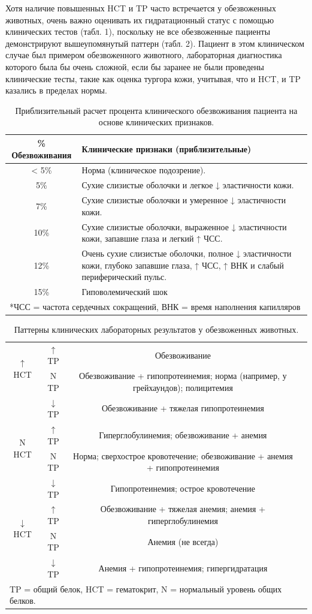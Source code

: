 \documentclass[a4paper,12pt]{book}
\begin{document}
Хотя наличие повышенных HCT и TP часто встречается у обезвоженных животных, очень важно оценивать их гидратационный статус с помощью клинических тестов (табл. 1), поскольку не все обезвоженные пациенты демонстрируют вышеупомянутый паттерн (табл. 2). Пациент в этом клиническом случае был примером обезвоженного животного, лабораторная диагностика которого была бы очень сложной, если бы заранее не были проведены клинические тесты, такие как оценка тургора кожи, учитывая, что и HCT, и TP казались в пределах нормы.

\begin{table}[htbp]
\centering
\caption{Приблизительный расчет процента клинического обезвоживания пациента на основе клинических признаков.}
\begin{tabular}{cl}
\toprule
\% Обезвоживания & Клинические признаки (приблизительные) \\
\midrule
< 5\% & Норма (клиническое подозрение). \\
5\% & Сухие слизистые оболочки и легкое ↓ эластичности кожи. \\
7\% & Сухие слизистые оболочки и умеренное ↓ эластичности кожи. \\
10\% & Сухие слизистые оболочки, выраженное ↓ эластичности кожи, запавшие глаза и легкий ↑ ЧСС. \\
12\% & Очень сухие слизистые оболочки, полное ↓ эластичности кожи, глубоко запавшие глаза, ↑ ЧСС, ↑ ВНК и слабый периферический пульс. \\
15\% & Гиповолемический шок \\
\bottomrule
\multicolumn{2}{l}{*ЧСС = частота сердечных сокращений, ВНК = время наполнения капилляров}
\end{tabular}
\end{table}

\begin{table}[htbp]
\centering
\caption{Паттерны клинических лабораторных результатов у обезвоженных животных.}
\begin{tabular}{@{}c|c|c|c@{}}
\toprule
\multirow{2}{*}{$\uparrow$ HCT} & $\uparrow$ TP & Обезвоживание \\
& N TP & Обезвоживание + гипопротеинемия; норма (например, у грейхаундов); полицитемия \\
& $\downarrow$ TP & Обезвоживание + тяжелая гипопротеинемия \\
\midrule
\multirow{2}{*}{N HCT} & $\uparrow$ TP & Гиперглобулинемия; обезвоживание + анемия \\
& N TP & Норма; сверхострое кровотечение; обезвоживание + анемия + гипопротеинемия \\
& $\downarrow$ TP & Гипопротеинемия; острое кровотечение \\
\midrule
\multirow{2}{*}{$\downarrow$ HCT} & $\uparrow$ TP & Обезвоживание + тяжелая анемия; анемия + гиперглобулинемия \\
& N TP & Анемия (не всегда) \\
& $\downarrow$ TP & Анемия + гипопротеинемия; гипергидратация \\
\bottomrule
\multicolumn{4}{l}{TP = общий белок, HCT = гематокрит, N = нормальный уровень общих белков.}
\end{tabular}
\end{table}
\end{document}
